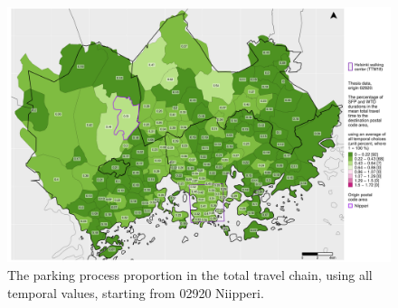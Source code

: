 \begin{figure}
    \centering
    \includegraphics[trim={0.9cm 0.3cm 0.25cm 0.3cm},clip,width=\textwidth]{images/compare_traveltimes_mapfill-msc_all_pct_fromzip-02920_28-09-2020.png}
    \caption[Parking process proportion from Niipperi, all temporal values]{The parking process proportion in the total travel chain, using all temporal values, starting from 02920 Niipperi.}%
    \label{fig:compare_msc_all_pct_02920}%
\end{figure}
\restoregeometry